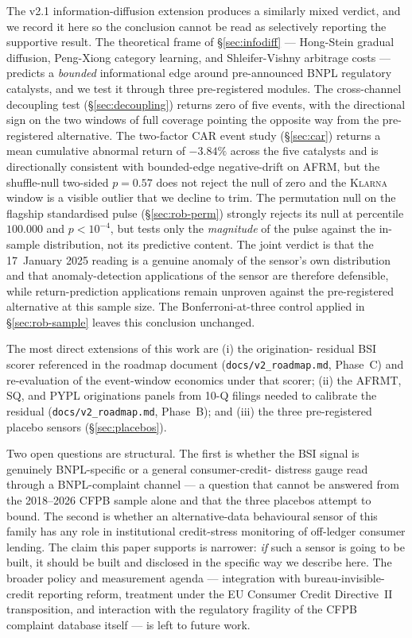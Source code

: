 \documentclass[11pt,letterpaper]{article}
\begin{document}
The v2.1 information-diffusion extension produces a similarly mixed
verdict, and we record it here so the conclusion cannot be read as
selectively reporting the supportive result. The theoretical frame
of \S\ref{sec:infodiff} --- Hong-Stein gradual diffusion,
Peng-Xiong category learning, and Shleifer-Vishny arbitrage costs
--- predicts a \emph{bounded} informational edge around
pre-announced BNPL regulatory catalysts, and we test it through
three pre-registered modules. The cross-channel decoupling test
(\S\ref{sec:decoupling}) returns zero of five events, with the
directional sign on the two windows of full coverage pointing the
opposite way from the pre-registered alternative. The two-factor
CAR event study (\S\ref{sec:car}) returns a mean cumulative
abnormal return of $-3.84\%$ across the five catalysts and is
directionally consistent with bounded-edge negative-drift on AFRM,
but the shuffle-null two-sided $p = 0.57$ does not reject the null
of zero and the \textsc{Klarna} window is a visible outlier that
we decline to trim. The permutation null on the flagship standardised
pulse (\S\ref{sec:rob-perm}) strongly rejects its null at percentile
$100.000$ and $p < 10^{-4}$, but tests only the \emph{magnitude} of
the pulse against the in-sample distribution, not its predictive
content. The joint verdict is that the 17~January 2025 reading is a
genuine anomaly of the sensor's own distribution and that
anomaly-detection applications of the sensor are therefore
defensible, while return-prediction applications remain unproven
against the pre-registered alternative at this sample size. The
Bonferroni-at-three control applied in \S\ref{sec:rob-sample}
leaves this conclusion unchanged.

The most direct extensions of this work are (i) the origination-
residual BSI scorer referenced in the roadmap document
(\texttt{docs/v2\_roadmap.md}, Phase~C) and re-evaluation of the
event-window economics under that scorer; (ii) the AFRMT, SQ, and
PYPL originations panels from 10-Q filings needed to calibrate the
residual (\texttt{docs/v2\_roadmap.md}, Phase~B); and (iii) the
three pre-registered placebo sensors (\S\ref{sec:placebos}).

Two open questions are structural. The first is whether the BSI
signal is genuinely BNPL-specific or a general consumer-credit-
distress gauge read through a BNPL-complaint channel --- a question
that cannot be answered from the 2018--2026 CFPB sample alone and
that the three placebos attempt to bound. The second is whether an
alternative-data behavioural sensor of this family has any role in
institutional credit-stress monitoring of off-ledger consumer
lending. The claim this paper supports is narrower: \emph{if} such
a sensor is going to be built, it should be built and disclosed in
the specific way we describe here. The broader policy and
measurement agenda --- integration with bureau-invisible-credit
reporting reform, treatment under the EU Consumer Credit
Directive~II transposition, and interaction with the regulatory
fragility of the CFPB complaint database itself --- is left to
future work.
\end{document}
